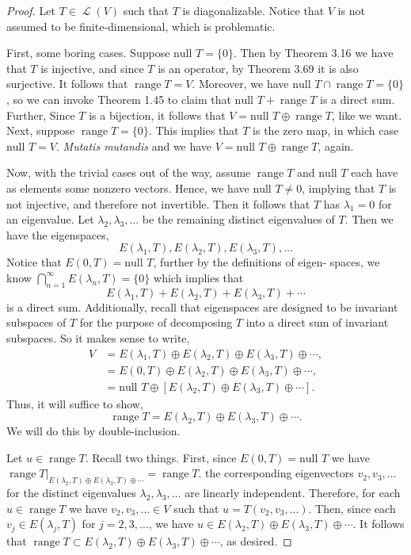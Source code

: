 \documentclass[letterpaper, 12pt]{amsart}
\DeclareMathOperator{\Ell}{\mathscr{L}}				%
\renewcommand{\null}{\text{null }}					%
\DeclareMathOperator{\range}{\text{range }}			%
\theoremstyle{definition}  							%
\begin{document}
		\begin{proof}
		Let $T \in \Ell(V)$ such that $T$ is diagonalizable.
		Notice that $V$ is not assumed to be finite-dimensional, which is problematic.

		First, some boring cases.
		Suppose $\null T = \{ 0 \}$.
		Then by Theorem 3.16 we have that $T$ is injective, and since $T$ is an operator, by Theorem 3.69 it is also surjective.
		It follows that $\range T = V$.
		Moreover, we have $\null T \cap \range T = \{ 0 \}$, so we can invoke Theorem 1.45 to claim that $\null T + \range T$ is a direct sum.
		Further, Since $T$ is a bijection, it follows that $V = \null T \oplus \range T$, like we want.
		Next, suppose $\range T = \{ 0 \}$.
		This implies that $T$ is the zero map, in which case $\null T = V$.
		\textit{Mutatis mutandis} and we have $V = \null T \oplus \range T$, again.

		Now, with the trivial cases out of the way, assume $\range T$ and $\null T$ each have as elements some nonzero vectors.
		Hence, we have $\null T \neq 0$, implying that $T$ is not injective, and therefore not invertible.
		Then it follows that $T$ has $\lambda_{1} = 0$ for an eigenvalue.
		Let $\lambda_{2},\lambda_{3}, \dots$ be the remaining distinct eigenvalues of $T$.
		Then we have the eigenspaces, $$E(\lambda_{1}, T), E(\lambda_{2},T), E(\lambda_{3}, T), \dots$$
		Notice that $E(0,T) = \null T$, further by the definitions of eigen-
		spaces, we know $\bigcap_{n=1}^{\infty} E(\lambda_{n},T) = \{ 0 \}$ which implies that $$E(\lambda_{1}, T) + E(\lambda_{2},T) + E(\lambda_{3},T) + \cdots$$ is a direct sum.
		Additionally, recall that eigenspaces are designed to be invariant subspaces of $T$ for the purpose of decomposing $T$ into a direct sum of invariant subspaces.
		So it makes sense to write,
			\begin{align*}
				V &= E(\lambda_{1}, T) \oplus E(\lambda_{2},T) \oplus E(\lambda_{3}, T) \oplus \cdots, \\
				&= E(0, T) \oplus E(\lambda_{2},T) \oplus E(\lambda_{3}, T) \oplus \cdots, \\
				&= \null T \oplus \left[ E(\lambda_{2},T) \oplus E(\lambda_{3}, T) \oplus \cdots \right].
			\end{align*}
		Thus, it will suffice to show, $$\range T = E(\lambda_{2},T) \oplus E(\lambda_{3}, T) \oplus \cdots.$$
		We will do this by double-inclusion.

		Let $u \in \range T$.
		Recall two things.
		First, since $E(0,T) = \null T$ we have $\range T|_{E(\lambda_{2},T) \oplus E(\lambda_{3}, T) \oplus \cdots} = \range T$.
		 the corresponding eigenvectors $v_{2}, v_{3}, \dots$ for the distinct eigenvalues $\lambda_{2}, \lambda_{3}, \dots$ are linearly independent.
		Therefore, for each $u \in \range T$ we have $v_{2}, v_{3}, \dots \in V$ such that $u = T(v_{2},v_{3},\dots)$.
		Then, since each $v_{j} \in E(\lambda_{j},T)$ for $j = 2,3,...$, we have $u \in E(\lambda_{2},T) \oplus E(\lambda_{3}, T) \oplus \cdots$.
		It follows that $\range T \subset E(\lambda_{2},T) \oplus E(\lambda_{3}, T) \oplus \cdots$, as desired.


\end{proof}
\end{document}
